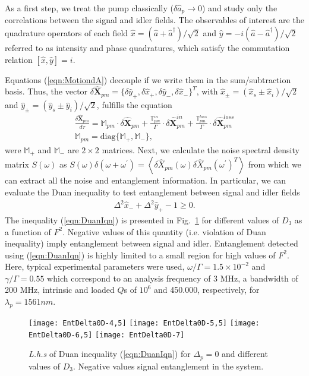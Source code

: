 \documentclass[aps,prl,twocolumn,groupedaddress]{revtex4-1}
\begin{document}
As a first step, we treat the pump classically ($\delta \hat{a}_p\rightarrow0$) and study only the correlations between the signal and idler fields. The observables of interest are the quadrature operators of each field $\hat{x}=(\hat{a}+\hat{a}^\dagger)/\sqrt{2}$ and $\hat{y}=-i(\hat{a}-\hat{a}^\dagger)/\sqrt{2}$ referred to as intensity and phase quadratures, which satisfy the commutation relation $\left[\hat{x},\hat{y}\right]=i$.

Equations (\ref{eqn:MotiondA}) decouple if we write them in the sum/subtraction basis. Thus, the vector $\delta\hat{\mathbf{X}}_{pm}=\{\delta\hat{y}_+,\delta\hat{x}_+,\delta\hat{y}_-,\delta\hat{x}_-\}^T$, with $\hat{x}_\pm=(\hat{x}_s\pm\hat{x}_i)/\sqrt{2}$ and $\hat{y}_\pm=(\hat{y}_s\pm\hat{y}_i)/\sqrt{2}$, fulfills the equation
\begin{eqnarray}
\frac{\delta\hat{\mathbf{X}}_{pm}}{d\tau}=\mathbb{M}_{pm}\cdot\delta\hat{\mathbf{X}}_{pm}+\frac{\mathbb{T}_{pm}^{in}}{\Gamma}\cdot\delta\hat{\mathbf{X}}_{pm}^{in}+\frac{\mathbb{T}_{pm}^{loss}}{\Gamma}\cdot\delta\hat{\mathbf{X}}_{pm}^{loss}\nonumber\\
	\mathbb{M}_{pm}=\text{diag}\{\mathbb{M}_{+},\mathbb{M}_-\},
\label{eqn:FluctiationEvoPM}
\end{eqnarray}
were $\mathbb{M}_{+}$ and $\mathbb{M}_-$ are $2\times2$ matrices.
Next, we calculate the noise spectral density matrix $S(\omega)$ as $S(\omega)\delta(\omega+\omega^\prime)=\left\langle\delta\hat{X}_{pm}(\omega)\delta\hat{X}_{pm}(\omega^\prime)^T\right\rangle$ from which we can extract all the noise and entanglement information. In particular, we can evaluate the Duan inequality \cite{Duan2000} to test entanglement between signal and idler fields
\begin{gather}
\Delta^2\hat{x}_- + \Delta^2\hat{y}_+  -1\geq 0.\label{eqn:DuanIqn}
\end{gather}
The inequality (\ref{eqn:DuanIqn}) is presented in Fig.~\ref{fig:DuanChi3} for different values of $D_3$ as a function of $F^2$. Negative values of this quantity (i.e. violation of Duan inequality) imply entanglement between signal and idler. Entanglement detected using (\ref{eqn:DuanIqn}) is highly limited to a small region for high values of $F^2$. Here, typical experimental parameters were used, $\omega/\Gamma=1.5\times10^{-2}$ and $\gamma/\Gamma=0.55$ which correspond to an analysis frequency of 3 MHz, a bandwidth of 200 MHz, intrinsic and loaded $Q$s of $10^6$ and 450.000, respectively, for $\lambda_p=1561nm$.
\begin{figure}[h]
	\begin{center}
		\texttt{[image: EntDelta0D-4,5]}
		\texttt{[image: EntDelta0D-5,5]}
		\texttt{[image: EntDelta0D-6,5]}
		\texttt{[image: EntDelta0D-7]}
		\caption{\textit{L.h.s} of Duan inequality (\ref{eqn:DuanIqn}) for $\Delta_p=0$ and different values of $D_3$. Negative values signal entanglement in the system.}
		\label{fig:DuanChi3}
	\end{center}
\end{figure} 
\end{document}

